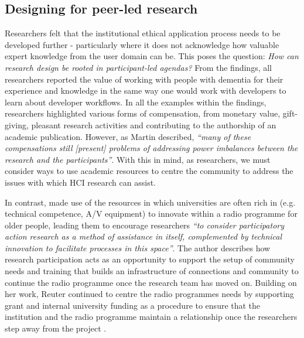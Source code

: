 \subsection{Designing for peer-led research}
\label{Discussion:PeerLedResearch}
Researchers felt that the institutional ethical application process needs to be developed further - particularly where it does not acknowledge how valuable expert knowledge from the user domain can be. This poses the question: \textit{How can research design be rooted in participant-led agendas?} From the findings, all researchers reported the value of working with people with dementia for their experience and knowledge in the same way one would work with developers to learn about developer workflows. In all the examples within the findings, researchers highlighted various forms of compensation, from monetary value, gift-giving, pleasant research activities and contributing to the authorship of an academic publication. However, as Martin described, \textit{``many of these compensations still [present] problems of addressing power imbalances between the research and the participants''}. With this in mind, as researchers, we must consider ways to use academic resources to centre the community to address the issues with which HCI research can assist.

In contrast, \cite{reuter_older_2019} made use of the resources in which universities are often rich in (e.g. technical competence, A/V equipment) to innovate within a radio programme for older people, leading them to encourage researchers \textit{``to consider participatory action research as a method of assistance in itself, complemented by technical innovation to facilitate processes in this space''}. The author describes how research participation acts as an opportunity to support the setup of community needs and training that builds an infrastructure of connections and community to continue the radio programme once the research team has moved on. Building on her work, Reuter continued to centre the radio programmes needs by supporting grant and internal university funding as a procedure to ensure that the institution and the radio programme maintain a relationship once the researchers step away from the project \citep{reuter2021content}. 

